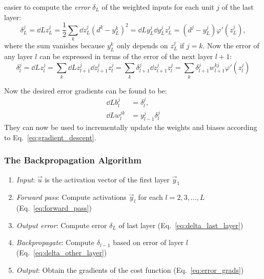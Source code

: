 easier to compute the \emph{error} $\delta_L$ of the weighted inputs for each
unit $j$ of the last layer:
\begin{equation}
  \delta^j_L = \dd{L}{z^j_L} = \frac{1}{2}\sum_k \dd{}{z^j_L}(d^k - y^k_L)^2
             = \dd{L}{y^j_L}\dd{y^j_L}{z^j_L}
             = (d^j - y^j_L) \varphi'(z^j_L) \label{eq:delta_last_layer},
\end{equation}
where the sum vanishes because $y^k_L$ only depends on $z^j_L$ if $j = k$.
Now the error of any layer $l$ can be expressed in terms of the error of the
next layer $l+1$:
\begin{equation}
  \delta^j_{l} = \dd{L}{z^j_l} = \sum_k \dd{L}{z^j_{l+1}}\dd{z^j_{l+1}}{z^j_l}
  = \sum_k \delta^j_{l+1} \dd{z^j_{l+1}}{z^j_l}
  = \sum_k \delta^j_{l+1} w^{kj}_{l+1} \varphi'(z^j_l) \label{eq:delta_other_layer}
\end{equation}

Now the desired error gradients can be found to be:
\begin{equation}
\begin{aligned}
  \dd{L}{b^j_l} &= \delta^j_l, \\
  \dd{L}{w^{jk}_l} &= y^j_{l-1} \delta^j_l \label{eq:error_grads}
\end{aligned}
\end{equation}
They can now be used to incrementally update the weights and biases according
to Eq.~\ref{eq:gradient_descent}.

\subsubsection{The Backpropagation Algorithm}%
\label{ssub:the_backpropagation_algorithm}

\begin{enumerate}
  \item \emph{Input}: $\vec{u}$ is the activation vector of the first layer
    $\vec{y}_1$
  \item \emph{Forward pass}: Compute activations $\vec{y}_l$ for each
    $l=2,3,...,L$ (Eq.~\ref{eq:forward_pass})
  \item \emph{Output error}: Compute error $\delta_L$ of last layer
    (Eq.~\ref{eq:delta_last_layer})
  \item \emph{Backpropagate}: Compute $\delta_{l-1}$ based on error of layer
    $l$ (Eq.~\ref{eq:delta_other_layer})
  \item \emph{Output}: Obtain the gradients of the cost function
    (Eq.~\ref{eq:error_grads})
\end{enumerate}
